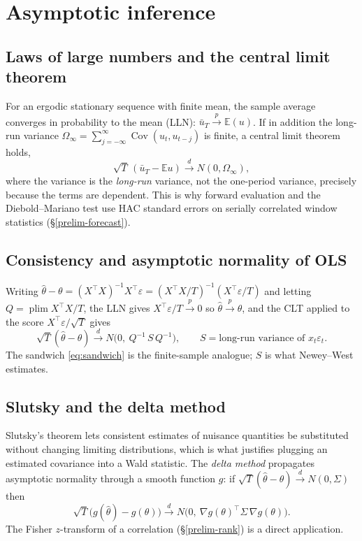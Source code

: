 \section{Asymptotic inference}\label{prelim-asymp}

\subsection{Laws of large numbers and the central limit theorem}

For an ergodic stationary sequence with finite mean, the sample average
converges in probability to the mean (LLN):
$\bar u_T\xrightarrow{p}\mathbb{E}(u)$. If in addition the long-run
variance $\Omega_\infty=\sum_{j=-\infty}^{\infty}\operatorname{Cov}(u_t,u_{t-j})$
is finite, a central limit theorem holds,
\begin{equation}\label{eq:clt}
\sqrt{T}\,(\bar u_T-\mathbb{E}u)\xrightarrow{d}N(0,\Omega_\infty),
\end{equation}
where the variance is the \emph{long-run} variance, not the one-period
variance, precisely because the terms are dependent. This is why forward
evaluation and the Diebold--Mariano test use HAC standard errors on serially
correlated window statistics (\S\ref{prelim-forecast}).

\subsection{Consistency and asymptotic normality of OLS}

Writing $\hat\theta-\theta=(X^{\top}X)^{-1}X^{\top}\varepsilon
=(X^{\top}X/T)^{-1}(X^{\top}\varepsilon/T)$ and letting
$Q=\operatorname*{plim}X^{\top}X/T$, the LLN gives $X^{\top}\varepsilon/T
\xrightarrow{p}0$ so $\hat\theta\xrightarrow{p}\theta$, and the CLT applied
to the score $X^{\top}\varepsilon/\sqrt T$ gives
\begin{equation}
\sqrt T(\hat\theta-\theta)\xrightarrow{d}N\bigl(0,\ Q^{-1}\,S\,Q^{-1}\bigr),
\qquad S=\text{long-run variance of }x_t\varepsilon_t .
\end{equation}
The sandwich \eqref{eq:sandwich} is the finite-sample analogue; $S$ is what
Newey--West estimates.

\subsection{Slutsky and the delta method}

Slutsky's theorem lets consistent estimates of nuisance quantities be
substituted without changing limiting distributions, which is what
justifies plugging an estimated covariance into a Wald statistic. The
\emph{delta method} propagates asymptotic normality through a smooth
function $g$: if
$\sqrt T(\hat\theta-\theta)\xrightarrow{d}N(0,\Sigma)$ then
\begin{equation}\label{eq:delta}
\sqrt T\bigl(g(\hat\theta)-g(\theta)\bigr)\xrightarrow{d}
N\!\bigl(0,\ \nabla g(\theta)^{\top}\Sigma\,\nabla g(\theta)\bigr).
\end{equation}
The Fisher $z$-transform of a correlation (\S\ref{prelim-rank}) is a direct
application.

